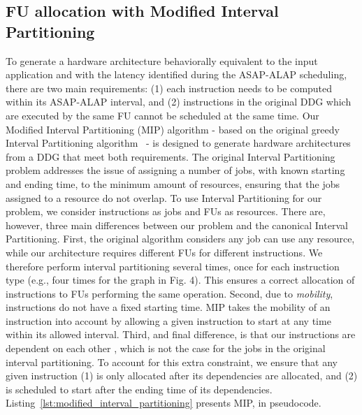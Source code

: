 \subsection{FU allocation with Modified Interval Partitioning}
\label{ssec:modified_interval_partitioning}
\vspace{-1mm}
To generate a hardware architecture behaviorally equivalent to the input application and with the latency identified during the ASAP-ALAP scheduling, there are two main requirements: (1) each instruction needs to be computed within its ASAP-ALAP interval, and (2) instructions in the original DDG which are executed by the same FU cannot be scheduled at the same time.
Our Modified Interval Partitioning (MIP) algorithm - based on the original greedy Interval Partitioning algorithm~\cite{greedyIntervalPartitioning} - is designed to generate hardware architectures from a DDG that meet both requirements. The original Interval Partitioning problem addresses the issue of assigning a number of jobs, with known starting and ending time, to the minimum amount of resources, ensuring that the jobs assigned to a resource do not overlap. To use Interval Partitioning for our problem, we consider instructions as jobs and FUs as resources. There are, however, three main differences between our problem and the canonical Interval Partitioning. 
First, the original algorithm considers any job can use any resource, while our architecture requires different FUs for different instructions. We therefore perform interval partitioning several times, once for each instruction type (e.g., four times for the graph in Fig. 4). This ensures a correct allocation of instructions to FUs performing the same operation. Second, due to \textit{mobility}, instructions do not have a fixed starting time. MIP takes the mobility of an instruction into account by allowing a given instruction to start at any time within its allowed interval. Third, and final difference, is that our instructions are dependent on each other , which is not the case for the jobs in the original interval partitioning. To account for this extra constraint, we ensure that any given instruction (1) is only allocated after its dependencies are allocated, and (2) is scheduled to start after the ending time of its dependencies.
Listing~\ref{lst:modified_interval_partitioning} presents MIP, in pseudocode. %

